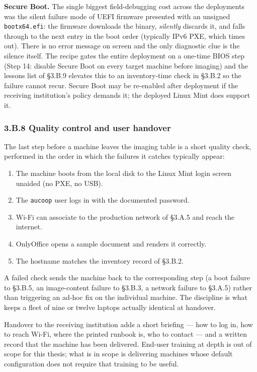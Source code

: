 \textbf{Secure Boot.} The single biggest field-debugging cost across the
deployments was the silent failure mode of UEFI firmware presented with
an unsigned \texttt{bootx64.efi}: the firmware downloads the binary,
\emph{silently} discards it, and falls through to the next entry in the
boot order (typically IPv6 PXE, which times out). There is no error
message on screen and the only diagnostic clue is the silence itself.
The recipe gates the entire deployment on a one-time BIOS step (Step 14:
disable Secure Boot on every target machine before imaging) and the
lessons list of §3.B.9 elevates this to an inventory-time check in
§3.B.2 so the failure cannot recur. Secure Boot may be re-enabled after
deployment if the receiving institution's policy demands it; the
deployed Linux Mint does support it.

\hypertarget{b.8-quality-control-and-user-handover}{%
\subsubsection{3.B.8 Quality control and user
handover}\label{b.8-quality-control-and-user-handover}}

The last step before a machine leaves the imaging table is a short
quality check, performed in the order in which the failures it catches
typically appear:

\begin{enumerate}
\def\labelenumi{\arabic{enumi}.}
\tightlist
\item
  The machine boots from the local disk to the Linux Mint login screen
  unaided (no PXE, no USB).
\item
  The \texttt{aucoop} user logs in with the documented password.
\item
  Wi-Fi can associate to the production network of §3.A.5 and reach the
  internet.
\item
  OnlyOffice opens a sample document and renders it correctly.
\item
  The hostname matches the inventory record of §3.B.2.
\end{enumerate}

A failed check sends the machine back to the corresponding step (a boot
failure to §3.B.5, an image-content failure to §3.B.3, a network failure
to §3.A.5) rather than triggering an ad-hoc fix on the individual
machine. The discipline is what keeps a fleet of nine or twelve laptops
actually identical at handover.

Handover to the receiving institution adds a short briefing --- how to
log in, how to reach Wi-Fi, where the printed runbook is, who to contact
--- and a written record that the machine has been delivered. End-user
training at depth is out of scope for this thesis; what is in scope is
delivering machines whose default configuration does not require that
training to be useful.

